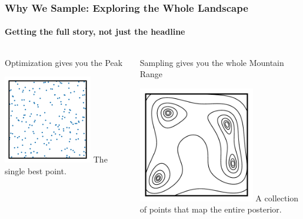 \documentclass[aspectratio=169]{beamer}
\begin{document}
\begin{frame}
    \frametitle{Why We Sample: Exploring the Whole Landscape}
    \framesubtitle{Getting the full story, not just the headline}
    
    \begin{columns}[T]
        \begin{block}{Optimization gives you the Peak}
            \begin{center}
                \includegraphics[width=0.7\textwidth,page=4]{figures/himmelblau_ns.pdf} %
                \small The single best point.
            \end{center}
        \end{block}
        
        \begin{block}{Sampling gives you the whole Mountain Range}
            \begin{center}
                \includegraphics[width=0.7\textwidth,page=9]{figures/himmelblau_mcmc.pdf} %
                \small A collection of points that map the entire posterior.
            \end{center}
        \end{block}
    \end{columns}
    

\end{frame}
\end{document}
